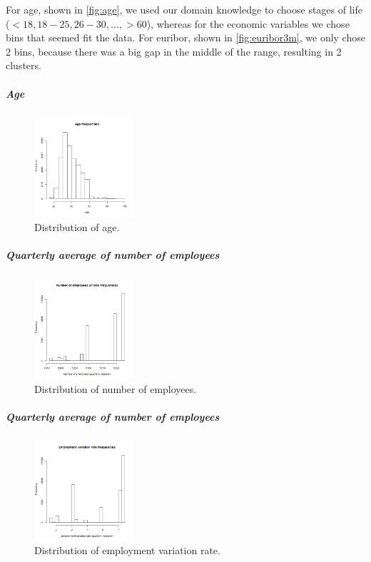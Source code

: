 \documentclass[11pt,]{article}
\let\oldsubparagraph\subparagraph
\renewcommand{\subparagraph}[1]{\oldsubparagraph{#1}\mbox{}}
\begin{document}
\begin{multicols}{2}
\medskip

For age, shown in \autoref{fig:age}, we used our domain knowledge to
choose stages of life (\(<18, 18-25, 26-30, ..., >60\)), whereas for the
economic variables we chose bins that seemed fit the data. For euribor,
shown in \autoref{fig:euribor3m}, we only chose 2 bins, because there
was a big gap in the middle of the range, resulting in 2 clusters.

\newpage

\hypertarget{age}{%
\subparagraph{Age}\label{age}}

\begin{figure}[H]
    \centering
    \includegraphics[width=0.33\textwidth]{images/age}
    \caption{Distribution of age.}
    \label{fig:age}
\end{figure}

\hypertarget{quarterly-average-of-number-of-employees}{%
\subparagraph{Quarterly average of number of
employees}\label{quarterly-average-of-number-of-employees}}

\begin{figure}[H]
    \centering
    \includegraphics[width=0.33\textwidth]{images/nr_employed}
    \caption{Distribution of number of employees.}
    \label{fig:nr_employed}
\end{figure}

\hypertarget{quarterly-average-of-number-of-employees-1}{%
\subparagraph{Quarterly average of number of
employees}\label{quarterly-average-of-number-of-employees-1}}

\begin{figure}[H]
    \centering
    \includegraphics[width=0.33\textwidth]{images/emp_var_rate}
    \caption{Distribution of employment variation rate.}
    \label{fig:emp_var_rate}
\end{figure}


\end{multicols}
\end{document}

